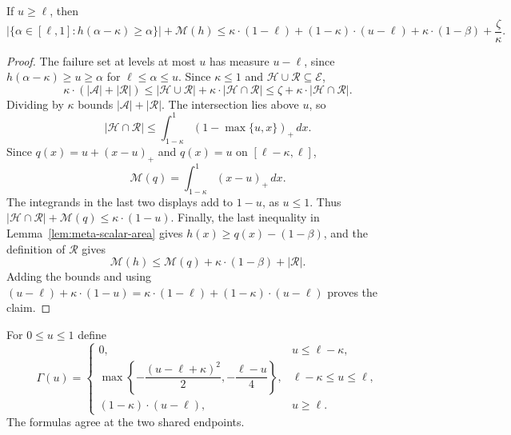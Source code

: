 \begin{lemma}
\label{lem:geometric-hinge}
If $u\ge\ell$, then
\[
 \bigl|\{\alpha\in[\ell,1]:h(\alpha-\kappa)\ge\alpha\}\bigr|
 +\mathcal M(h)
 \le \kappa\cdot(1-\ell)+(1-\kappa)\cdot(u-\ell)
      +\kappa\cdot(1-\beta)+\frac{\zeta}{\kappa}.
\]
\end{lemma}
\begin{proof}
The failure set at levels at most $u$ has measure $u-\ell$, since
$h(\alpha-\kappa)\ge u\ge\alpha$ for $\ell\le\alpha\le u$.
Since $\kappa\le1$ and $\mathcal H\cup\mathcal R\subseteq\mathcal E$,
\[
 \kappa\cdot(|\mathcal A|+|\mathcal R|)
 \le|\mathcal H\cup\mathcal R|+\kappa\cdot|\mathcal H\cap\mathcal R|
 \le\zeta+\kappa\cdot|\mathcal H\cap\mathcal R|.
\]
Dividing by $\kappa$ bounds $|\mathcal A|+|\mathcal R|$.
The intersection lies above $u$, so
\[
 |\mathcal H\cap\mathcal R|
 \le\int_{1-\kappa}^{1}(1-\max\{u,x\})_+\,dx.
\]
Since $q(x)=u+(x-u)_+$ and $q(x)=u$ on $[\ell-\kappa,\ell]$,
\[
 \mathcal M(q)=\int_{1-\kappa}^{1}(x-u)_+\,dx.
\]
The integrands in the last two displays add to $1-u$, as $u\le1$.
Thus $|\mathcal H\cap\mathcal R|+\mathcal M(q)\le\kappa\cdot(1-u)$.
Finally, the last inequality in Lemma~\ref{lem:meta-scalar-area} gives $h(x)\ge q(x)-(1-\beta)$,
and the definition of $\mathcal R$ gives
\[
 \mathcal M(h)\le\mathcal M(q)+\kappa\cdot(1-\beta)+|\mathcal R|.
\]
Adding the bounds and using
$(u-\ell)+\kappa\cdot(1-u)=\kappa\cdot(1-\ell)+(1-\kappa)\cdot(u-\ell)$ proves the claim.
\end{proof}

For $0\le u\le1$ define
\[
 \Gamma(u)=
 \begin{cases}
 0,&u\le\ell-\kappa,\\
 \max\left\{-\dfrac{(u-\ell+\kappa)^2}{2},
 -\dfrac{\ell-u}{4}\right\},
       &\ell-\kappa\le u\le\ell,\\
 (1-\kappa)\cdot(u-\ell),&u\ge\ell.
 \end{cases}
\]
The formulas agree at the two shared endpoints.

